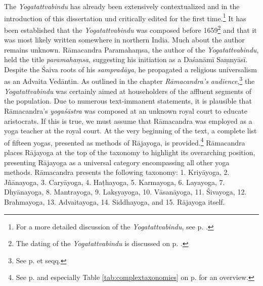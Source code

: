 The \emph{Yogatattvabindu} has already been extensively contextualized and in the introduction of this dissertation und critically edited for the first time.\footnote{For a more detailed discussion of the \emph{Yogatattvabindu}, see p. \pageref{generalremarks}.} It has been established that the \emph{Yogatattvabindu} was composed before 1659\footnote{The dating of the \emph{Yogatattvabindu} is discussed on p. \pageref{dating}.} and that it was most likely written somewhere in northern India. Much about the author remains unknown. Rāmacandra Paramahaṃsa, the author of the \emph{Yogatattvabindu}, held the title \textit{paramahaṃsa}, suggesting his initiation as a Daśanāmī Saṃnyāsī. Despite the Śaiva roots of his \textit{sampradāya}, he propagated a religious universalism as an Advaita Vedāntin. As outlined in the chapter \textit{Rāmacandra's audience},\footnote{See p. \pageref{ytb-audience} et seqq.} the \emph{Yogatattvabindu} was certainly aimed at householders of the affluent segments of the population. Due to numerous text-immanent statements, it is plausible that Rāmacandra's \textit{yogaśāstra} was composed at an unknown royal court to educate aristocrats. If this is true, we must assume that Rāmacandra was employed as a yoga teacher at the royal court. At the very beginning of the text, a complete list of fifteen yogas, presented as methods of Rājayoga, is provided.\footnote{See p. \pageref{intro} and especially Table \ref{tab:complextaxonomies} on p. \pageref{tab:complextaxonomies} for an overview.} Rāmacandra places Rājayoga at the top of the taxonomy to highlight its overarching position, presenting Rājayoga as a universal category encompassing all other yoga methods. Rāmacandra presents the following taxonomy: 1. Kriyāyoga, 2. Jñānayoga, 3. Caryāyoga, 4. Haṭhayoga, 5. Karmayoga, 6. Layayoga, 7. Dhyānayoga, 8. Mantrayoga, 9. Lakṣyayoga, 10. Vāsanāyoga, 11. Śivayoga, 12. Brahmayoga, 13. Advaitayoga, 14. Siddhayoga, and 15. Rājayoga itself.    


